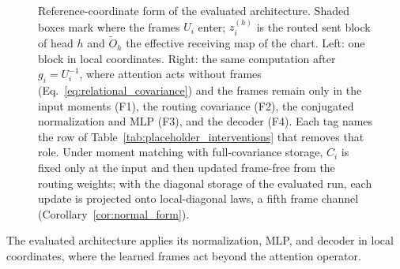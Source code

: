 \documentclass[twoside,11pt]{article}
\begin{document}
\begin{figure}[tbp]
\caption{Reference-coordinate form of the evaluated architecture. Shaded boxes mark where the frames $U_i$ enter; $z_i^{(h)}$ is the routed sent block of head $h$ and $\widetilde O_h$ the effective receiving map of the chart. Left: one block in local coordinates. Right: the same computation after $g_i=U_i^{-1}$, where attention acts without frames (Eq.~\eqref{eq:relational_covariance}) and the frames remain only in the input moments (F1), the routing covariance (F2), the conjugated normalization and MLP (F3), and the decoder (F4). Each tag names the row of Table~\ref{tab:placeholder_interventions} that removes that role. Under moment matching with full-covariance storage, $C_i$ is fixed only at the input and then updated frame-free from the routing weights; with the diagonal storage of the evaluated run, each update is projected onto local-diagonal laws, a fifth frame channel (Corollary~\ref{cor:normal_form}).}
\label{fig:placeholder_reference_gauge}
\end{figure}

The evaluated architecture applies its normalization, MLP, and decoder in local coordinates, where the learned frames act beyond the attention operator.
\end{document}
